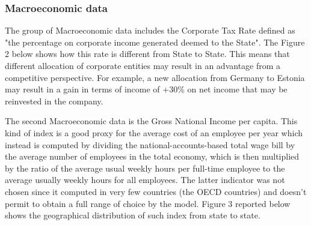 \documentclass{article}
\begin{document}
\subsubsection{Macroeconomic data}
The group of Macroeconomic data includes the Corporate Tax Rate defined as "the percentage on corporate income generated deemed to the State". The Figure 2 below shows how this rate is different from State to State. This means that different allocation of corporate entities may result in an advantage from a competitive perspective. For example, a new allocation from Germany to Estonia may result in a gain in terms of income of +30\% on net income that may be reinvested in the company.  

The second Macroeconomic data is the Gross National Income per capita. This kind of index is a good proxy for the average cost of an employee per year which instead is computed by dividing the national-accounts-based total wage bill by the average number of employees in the total economy, which is then multiplied by the ratio of the average usual weekly hours per full-time employee to the average usually weekly hours for all employees. The latter indicator was not chosen since it computed in very few countries (the OECD countries) and doesn't permit to obtain a full range of choice by the model. Figure 3 reported below shows the geographical distribution of such index from state to state.
\end{document}
